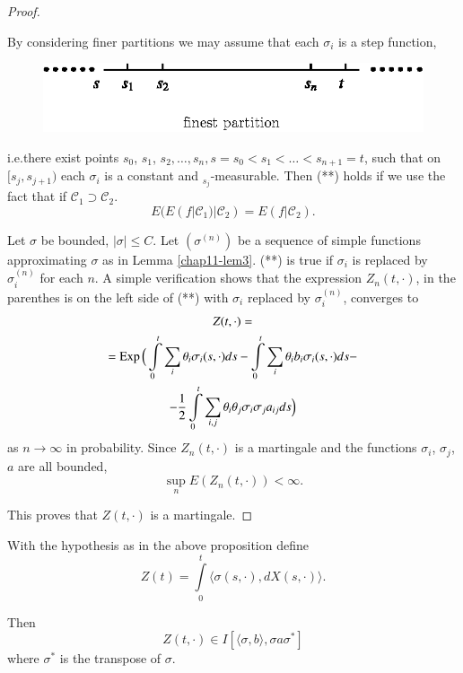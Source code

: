 \begin{proof}
\begin{step}
By considering finer partitions we may assume that each $\sigma_{i}$
is a step function,
\begin{figure}[H]
\centering
\includegraphics{figure/fig11.eps}
\end{figure}
\noindent
i.e.\@ there exist points $s_{0}$, $s_{1}$,
$s_{2},\ldots,s_{n},s=s_{0}<s_{1}<\ldots<s_{n+1}=t$, such that on
$[s_{j},s_{j+1})$ each $\sigma_{i}$ is a constant and
  ${}_{s_{j}}$-measurable. Then (**) holds if we use the fact that if
  $\mathscr{C}_{1}\supset \mathscr{C}_{2}$.
$$
E(E(f|\mathscr{C}_{1})|\mathscr{C}_{2})=E(f|\mathscr{C}_{2}).
$$
\end{step}

\begin{step}%
Let $\sigma$ be bounded, $|\sigma|\leq C$. Let $(\sigma^{(n)})$ be a
sequence of simple functions approximating $\sigma$ as in Lemma
\ref{chap11-lem3}. (**) is true if $\sigma_{i}$ is\pageoriginale
replaced by $\sigma^{(n)}_{i}$ for each $n$. A simple verification
shows that the expression $Z_{n}(t,\cdot)$, in the parenthes is on the
left side of (**) with $\sigma_{i}$ replaced by $\sigma^{(n)}_{i}$,
converges to
\begin{gather*}
Z(t,\cdot)=\\
=\operatorname{Exp}\Big(\int\limits^{t}_{0}\sum_{i}\theta_{i}\sigma_{i}(s,\cdot)ds-\int\limits^{t}_{0}\sum_{i}\theta_{i}b_{i}\sigma_{i}(s,\cdot)ds-\\
-\frac{1}{2}\int\limits^{t}_{0}\sum_{i,j}\theta_{i}\theta_{j}\sigma_{i}\sigma_{j}a_{ij}ds\Big)
\end{gather*}
as $n\to \infty$ in probability. Since $Z_{n}(t,\cdot)$ is a
martingale and the functions $\sigma_{i}$, $\sigma_{j}$, $a$ are all
bounded,
$$
\sup\limits_{n}E(Z_{n}(t,\cdot))<\infty.
$$
\end{step}

This proves that $Z(t,\cdot)$ is a martingale.
\end{proof}

\begin{coro*}
With the hypothesis as in the above proposition define
$$
Z(t)=\int\limits^{t}_{0}\langle \sigma(s,\cdot),dX(s,\cdot)\rangle.
$$

Then
$$
Z(t,\cdot)\in I[\langle \sigma,b\rangle, \sigma a\sigma^{*}]
$$
where $\sigma^{*}$ is the transpose of $\sigma$.
\end{coro*}

